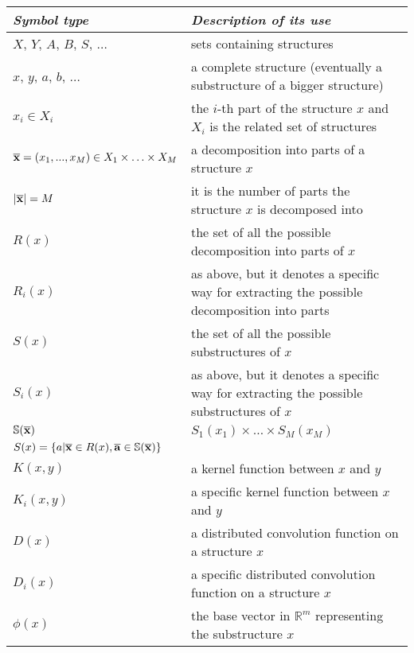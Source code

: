 \documentclass[twoside,11pt]{article}
\def\substr#1{{\bf\overline{#1}}}
\def\R{\mathbb{R}}
\def\OBV#1{\phi(#1)}
\def\comment#1#2{}
\begin{document}
\comment{[R3,C11][IssueA][IssueB]}{Notations are poor, and I encourage the authors to start from scratch and redefine them completely, now that they have a more clear idea of what their target result is.}
\comment{[R1,C11][IssueB]}{There is a lot of notation whose definitions are spread throughout the paper. It might be useful to provide a table of notation at the end of the paper. There is also some re-use of symbols.}
\begin{small}
\begin{tabular}{lp{10cm}}
\emph{Symbol type} & \emph{Description of its use}\\
\hline
$X$, $Y$, $A$, $B$, $S$, $\ldots$ & sets containing structures \\
$x$, $y$, $a$, $b$, $\ldots$ & a complete structure (eventually a substructure of a bigger structure)\\
$x_i \in X_i$  & the $i$-th part of the structure $x$ and $X_i$ is the related set of structures \\
$\substr{x} = (x_1,...,x_M) \in X_1 \times \ldots \times X_M$ & a decomposition into parts of a structure $x$\\
$|\substr{x}| = M$ & it is the number of parts the structure $x$ is decomposed into\\
$R(x)$  & the set of all the possible decomposition into parts of $x$\\
$R_i(x)$  & as above, but it denotes a specific way for extracting the possible decomposition into parts \\
$S(x)$  & the set of all the possible substructures of $x$\\
$S_i(x)$  & as above, but it denotes a specific way for extracting the possible substructures of $x$\\
${\mathbb S}(\substr{x})$ & $S_1(x_1) \times  \ldots \times S_M(x_M)$\\
$S(x) = \{ a | \substr{x} \in R(x), \substr{a} \in {\mathbb S}(\substr{x})\}$\\
\hline
$K(x,y)$ &  a kernel function between $x$ and $y$\\ 
$K_i(x,y)$ &  a specific kernel function between $x$ and $y$\\ 
\hline
$D(x)$ &  a distributed convolution function on a structure $x$\\ 
$D_i(x)$ &  a specific distributed convolution function on a structure $x$\\ 
\hline
$\OBV{x}$ & the base vector in $\R^m$ representing the substructure $x$\\

\end{tabular}
\end{small}
\end{document}
